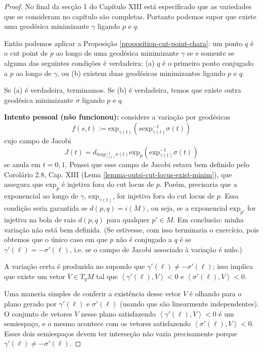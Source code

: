 \documentclass{book}
\begin{document}
\begin{proof}
No final da secção 1 do Capítulo XIII está
especificado que as variedades que se
consideram no capítulo são completas.
Portanto podemos supor que existe
uma geodésica minimizante $\gamma$ ligando
$p$ e $q$.

Então podemos aplicar a Proposição
\ref{proposition-cut-point-chara}:
 um ponto $q$ é o cut point de $p$ ao longo
 de uma
geodésica minimizante $\gamma$ se e somente
se
alguma das seguintes condições é verdadeira:
(a) $q$ é o primeiro ponto conjugado a $p$ ao
longo de $\gamma$, ou
(b) existem duas geodésicas minimizantes
ligando $p$ e $q$.

Se (a) é verdadeira, terminamos. Se (b) é
verdadeira, temos que existe outra
geodésica minimizante $\sigma$ ligando $p$ e
$q$.

{\bf Intento pessoal (não funcionou):}
considere a variação por geodésicas
$$
f(s,t):=\text{exp}_{\gamma(t)}
(s\text{exp}_{\gamma(t)}^{-1}\sigma(t))
$$
cujo campo de Jacobi
$$
J(t)=d_{t\text{exp}_{\gamma(t)}^{-1}\sigma(t)
}
\text{exp}_p(\text{exp}_{\gamma(t)}^{-1}
\sigma(t))
$$
se anula em $t=0,1$. Pensei que esse campo de
Jacobi estava bem definido pelo
Corolário 2.8, Cap. XIII (Lema
\ref{lemma-outsi-cut-locus-exist-minim}), que
assegura
 que $\text{exp}_p$ é injetiva fora do cut
 locus de $p$. Porém, precisaria
 que a exponencial ao longo de $\gamma$,
 $\text{exp}_{\gamma(t)}$, for injetiva fora
 do cut locus de $p$.
Essa condição seria garantida se
$d(p,q)=i(M)$, ou seja, se a exponencial
 $\text{exp}_{p'}$ for injetiva na bola de
 raio $d(p,q)$ para qualquer
$p' \in M$. Em conclusão: minha variação não
está bem definida.
(Se estivesse, com
isso terminaria o exercício, pois obtemos que
o único caso em que $p$ não é
conjugado a $q$ é se
$\gamma'(\ell)=-\sigma'(\ell)$, i.e. se o
campo de Jacobi
associado à variação é nulo.)

\bigskip

A variação certa é produzida no \cite{doc}
supondo que
$\gamma'(\ell)\neq -\sigma'(\ell)$; isso
implica que existe um vetor
 $V \in T_q M$ tal que
$\left\langle{}\gamma'(\ell),V\right\rangle{}< 0$ e
$\left\langle{}\sigma'(\ell),V\right\rangle{}< 0$.

Uma maneria simples de conferir a existência
desse vetor $V$ é olhando para o
plano gerado por $\gamma'(\ell)$ e
$\sigma'(\ell)$ (usando que são linearmente
independentes). O conjunto de vetores $V$
nesse plano satisfazendo
$\left\langle{}\gamma'(\ell),V\right\rangle{}<0$ é um
semiespaço, e o mesmo acontece com
 os vetores satisfazendo
 $\left\langle{}\sigma'(\ell),V\right\rangle{}<0$. Esses dois
 semiespaços
devem ter interseção não vazia precisamente
porque
$\gamma'(\ell)\neq -\sigma'(\ell)$.


\end{proof}
\end{document}
